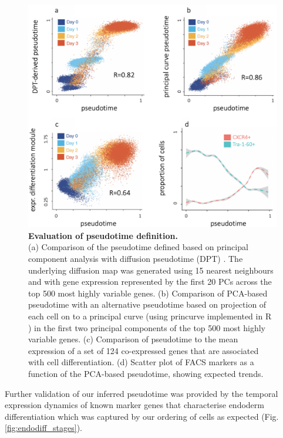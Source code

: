 \begin{figure}[htbp]
\centering
\includegraphics[width=14cm]{Chapter4/Fig/endodiff_pseudotimes.png}
\caption[Evaluation of pseudotime definition]{\textbf{Evaluation of pseudotime definition.}\\
(a) Comparison of the pseudotime defined based on principal component analysis with diffusion pseudotime (DPT) \cite{haghverdi2016diffusion}. 
The underlying diffusion map was generated using 15 nearest neighbours and with gene expression represented by the first 20 PCs across the top 500 most highly variable genes.  
(b) Comparison of PCA-based pseudotime with an alternative pseudotime based on projection of each cell on to a principal curve (using princurve implemented in R \cite{hastie1989principal}) in the first two principal components of the top 500 most highly variable genes. 
(c) Comparison of pseudotime to the mean expression of a set of 124 co-expressed genes that are associated with cell differentiation. 
(d) Scatter plot of FACS markers as a function of the PCA-based pseudotime, showing expected trends.}
\label{fig:endodiff_pseudotimes}
\end{figure}

Further validation of our inferred pseudotime was provided by the temporal expression dynamics of known marker genes that characterise endoderm differentiation which was captured by our ordering of cells as expected (Fig. \ref{fig:endodiff_stages}).

